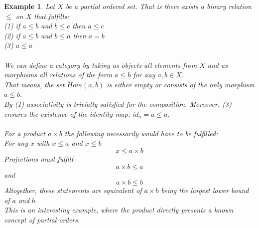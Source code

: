 \documentclass[17pt]{extarticle}
\newtheorem*{example*}{Example}
\begin{document}
\begin{example*}
	Let $X$ be a partial ordered set. That is there exists a binary relation $\leq$ on $X$
	that fulfills:\\
	(1) if $a\leq b$ and $b\leq c$ then $a\leq c$\\
	(2) if $a\leq b$ and $b\leq a$ then $a=b$\\
	(3) $a\leq a$\\ \\
	We can define a category by taking as objects all elements from $X$ and as morphisms all relations of the form $a\leq b$ for any $a,b\in X$.\\
	That means, the set $Hom(a,b)$ is either empty or consists of the only morphism $a\leq b$.\\
	By (1) associativity is trivially satisfied for the composition. Moreover, (3) ensures the existence of the identity map: $id_a = a\leq a$.\\ \\
	For a product $a\times b$ the following necessarily would have to be fulfilled:\\
	For any $x$ with $x\leq a$ and $x\leq b$
	$$x\leq a\times b$$
	Projections must fulfill
	$$a\times b\leq a$$
	and
	$$a\times b\leq b$$
	Altogether, these statements are equivalent of $a\times b$ being the largest lower bound of $a$ and $b$.\\
    This is an interesting example, where the product directly presents a known concept of partial orders.	
\end{example*}
\end{document}
